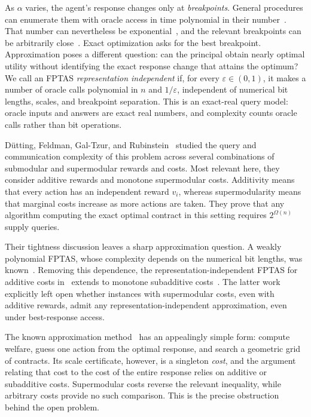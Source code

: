 \documentclass[11pt]{article}
\newcommand{\eps}{\varepsilon}
\begin{document}
As $\alpha$ varies, the agent's response changes only at
\emph{breakpoints}.  General procedures can enumerate them with oracle
access in time polynomial in their number~\cite{DDPP24,DFG24}.  That number
can nevertheless be exponential~\cite{DEFK21}, and the relevant
breakpoints can be arbitrarily close~\cite{DFGR26}.  Exact optimization asks
for the best breakpoint.  Approximation poses a different question: can the
principal obtain nearly optimal utility without identifying the exact
response change that attains the optimum?  We call an FPTAS
\emph{representation independent} if, for every $\eps\in(0,1)$, it makes a
number of oracle calls polynomial in $n$ and $1/\eps$, independent of
numerical bit lengths, scales, and breakpoint separation.  This is an
exact-real query model: oracle inputs and answers are exact real numbers,
and complexity counts oracle calls rather than bit operations.

D\"utting, Feldman, Gal-Tzur, and Rubinstein~\cite{DFGR26} studied the query
and communication complexity of this problem across several combinations
of submodular and supermodular rewards and costs.  Most relevant here, they
consider additive rewards and monotone supermodular costs.  Additivity means
that every action has an independent reward $v_i$, whereas supermodularity
means that marginal costs increase as more actions are taken.  They prove
that any algorithm computing the exact optimal contract in this setting
requires $2^{\Omega(n)}$ supply queries.

Their tightness discussion leaves a sharp approximation question.  A
weakly polynomial FPTAS, whose complexity depends on the numerical bit
lengths, was known~\cite{DEFK21}.  Removing this dependence, the
representation-independent FPTAS for additive costs in~\cite{DEFK25}
extends to monotone subadditive costs~\cite[Appendix~B]{DFGR26}.  The latter work
explicitly left open
whether instances with supermodular costs, even with additive rewards,
admit any representation-independent approximation, even under
best-response access.

The known approximation method~\cite{DEFK25,DFGR26} has an appealingly
simple form: compute welfare, guess one action from the optimal response,
and search a geometric grid of contracts.  Its scale certificate, however,
is a singleton
\emph{cost}, and the argument relating that cost to the cost of the entire
response relies on additive or subadditive costs.  Supermodular costs reverse
the relevant inequality, while arbitrary costs provide no such comparison.
This is the precise obstruction behind the open problem.
\end{document}
